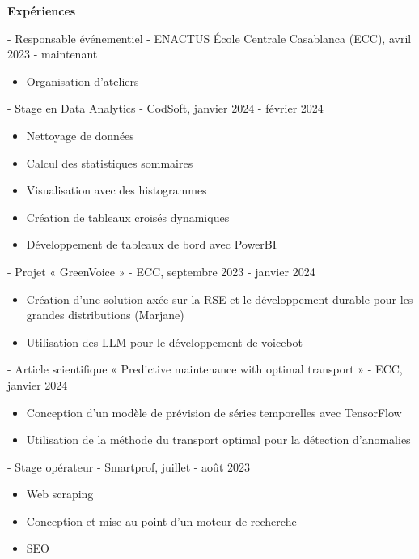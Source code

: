 \documentclass[11pt]{article}
\newcommand{\subsectiontitle}[1]{\noindent\textbf{#1}}
\begin{document}
\begin{multicols}{2}

\subsectiontitle{Expériences}

- Responsable événementiel - ENACTUS École Centrale Casablanca (ECC), avril 2023 - maintenant
\begin{itemize}[topsep=0pt, partopsep=0pt, parsep=0pt, leftmargin=1.2cm]
    \item Organisation d'ateliers
\end{itemize}

- Stage en Data Analytics - CodSoft, janvier 2024 - février 2024
\begin{itemize}[topsep=0pt, partopsep=0pt, parsep=0pt, leftmargin=1.2cm]
    \item Nettoyage de données
    \item Calcul des statistiques sommaires
    \item Visualisation avec des histogrammes
    \item Création de tableaux croisés dynamiques
    \item Développement de tableaux de bord avec PowerBI
\end{itemize}

- Projet « GreenVoice » - ECC, septembre 2023 - janvier 2024
\begin{itemize}[topsep=0pt, partopsep=0pt, parsep=0pt, leftmargin=1.2cm]
    \item Création d'une solution axée sur la RSE et le développement durable pour les grandes distributions (Marjane)
    \item Utilisation des LLM pour le développement de voicebot
\end{itemize}

- Article scientifique « Predictive maintenance with optimal transport » - ECC, janvier 2024
\begin{itemize}[topsep=0pt, partopsep=0pt, parsep=0pt, leftmargin=1.2cm]
    \item Conception d'un modèle de prévision de séries temporelles avec TensorFlow
    \item Utilisation de la méthode du transport optimal pour la détection d'anomalies
\end{itemize}

- Stage opérateur - Smartprof, juillet - août 2023
\begin{itemize}[topsep=0pt, partopsep=0pt, parsep=0pt, leftmargin=1.2cm]
    \item Web scraping
    \item Conception et mise au point d'un moteur de recherche
    \item SEO
\end{itemize}


\end{multicols}
\end{document}
